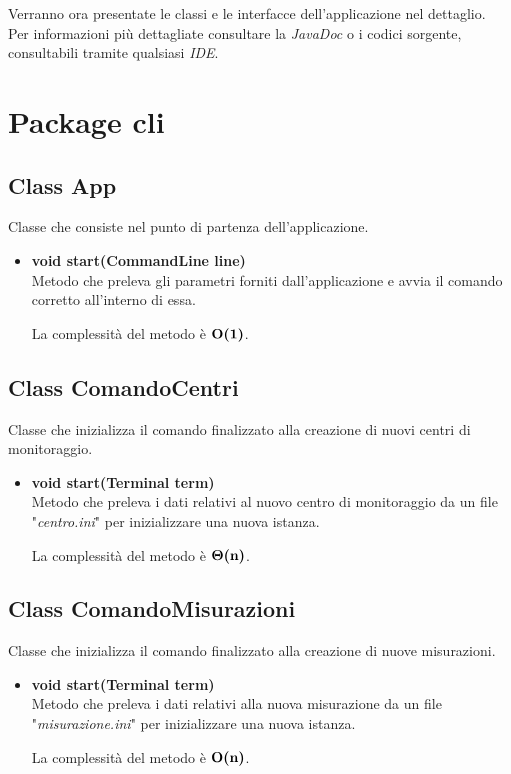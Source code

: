 \documentclass[a4paper, 12pt]{scrreprt}
\begin{document}
	Verranno ora presentate le classi e le interfacce dell'applicazione nel dettaglio. \\Per informazioni più dettagliate consultare la \textsl{JavaDoc} o i codici sorgente, consultabili tramite qualsiasi \textsl{IDE}.
	\pagebreak
		\section{Package cli}
			\subsection{Class App}
			Classe che consiste nel punto di partenza dell'applicazione.
			\begin{itemize}
				\item \textbf{void start(CommandLine line)}
				\\Metodo che preleva gli parametri forniti dall'applicazione e avvia il comando corretto all'interno di essa.
				
				La complessit\`a del metodo \`e $\mathbf{O}\textbf{(1)}$.
			\end{itemize}
			
			\subsection{Class ComandoCentri}
			Classe che inizializza il comando finalizzato alla creazione di nuovi centri di monitoraggio.
			\begin{itemize}
				\item \textbf{void start(Terminal term)}
				\\Metodo che preleva i dati relativi al nuovo centro di monitoraggio da un file "\textsl{centro.ini}" per inizializzare una nuova istanza.
				
				La complessit\`a del metodo \`e $\mathbf{\Theta}\textbf{(n)}$.
				
			\end{itemize}
			
			\subsection{Class ComandoMisurazioni}
			Classe che inizializza il comando finalizzato alla creazione di nuove misurazioni.
			\begin{itemize}
				\item \textbf{void start(Terminal term)}
				\\Metodo che preleva i dati relativi alla nuova misurazione da un file "\textsl{misurazione.ini}" per inizializzare una nuova istanza.
				
				La complessit\`a del metodo \`e $\mathbf{O}\textbf{(n)}$.
				
			\end{itemize}
			
\end{document}
